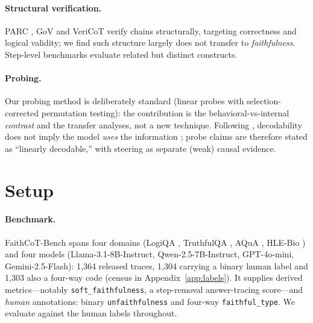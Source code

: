\documentclass[11pt]{article}
\begin{document}
\paragraph{Structural verification.} PARC \citep{mukherjee2025parc}, GoV \citep{fang2025gov} and VeriCoT \citep{feng2025vericot} verify chains structurally, targeting correctness and logical validity; we find such structure largely does not transfer to \emph{faithfulness}. Step-level benchmarks \citep{zheng2024processbench,jacovi2024reveal,pham2026grace} evaluate related but distinct constructs.

\paragraph{Probing.} Our probing method is deliberately standard (linear probes with selection-corrected permutation testing): the contribution is the behavioral-vs-internal \emph{contrast} and the transfer analyses, not a new technique. Following \citet{belinkov2022probing}, decodability does not imply the model \emph{uses} the information \citep{elazar2021amnesic}; probe claims are therefore stated as ``linearly decodable,'' with steering as separate (weak) causal evidence.

\section{Setup}
\label{sec:setup}

\paragraph{Benchmark.} FaithCoT-Bench spans four domains (LogiQA \citep{liu2020logiqa}, TruthfulQA \citep{lin2022truthfulqa}, AQuA \citep{ling2017aqua}, HLE-Bio \citep{phan2025hle}) and four models (Llama-3.1-8B-Instruct, Qwen-2.5-7B-Instruct, GPT-4o-mini, Gemini-2.5-Flash): 1{,}364 released traces, 1{,}304 carrying a binary human label and 1{,}303 also a four-way code (census in Appendix~\ref{app:labels}). It supplies derived metrics---notably \texttt{soft\_faithfulness}, a step-removal answer-tracing score---and \emph{human} annotations: binary \texttt{unfaithfulness} and four-way \texttt{faithful\_type}. We evaluate against the human labels throughout.
\end{document}
